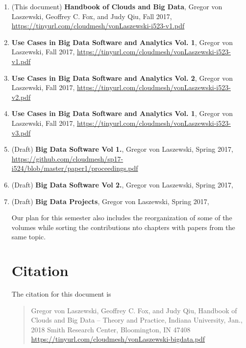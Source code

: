 \begin{enumerate}
\item (This document) {\bf Handbook of Clouds and Big Data}, Gregor von Laszewski,
  Geoffrey C. Fox, and Judy Qiu, Fall 2017,
  \url{https://tinyurl.com/cloudmesh/vonLaszewski-i523-v1.pdf}

\item {\bf Use Cases in Big Data Software and
  Analytics Vol. 1}, Gregor von Laszewski, Fall 2017,
  \url{https://tinyurl.com/cloudmesh/vonLaszewski-i523-v1.pdf}

\item {\bf Use Cases in Big Data Software and
  Analytics Vol. 2}, Gregor von Laszewski, Fall 2017, \url{https://tinyurl.com/cloudmesh/vonLaszewski-i523-v2.pdf}

\item  {\bf Use Cases in Big Data Software and
  Analytics Vol. 1}, Gregor von Laszewski, Fall 2017, \url{https://tinyurl.com/cloudmesh/vonLaszewski-i523-v3.pdf}

\item (Draft) {\bf Big Data Software Vol 1.}, Gregor von Laszewski, Spring 2017,
\url{https://github.com/cloudmesh/sp17-i524/blob/master/paper1/proceedings.pdf}

\item (Draft) {\bf Big Data Software Vol 2.}, Gregor von Laszewski, Spring 2017,

\item (Draft) {\bf Big Data Projects}, Gregor von Laszewski, Spring 2017,

Our plan for this semester also includes the reorganization of some of
the volumes while sorting the contributions nto chapters with papers
from the same topic.

\section{Citation}

The citation for this document is 

\begin{quote}
Gregor von Laszewski, Geoffrey C. Fox, and Judy Qiu, Handbook of
Clouds and Big Data -- Theory and Practice, Indiana University,
Jan., 2018
Smith Research Center, Bloomington, IN 47408
\url{https://tinyurl.com/cloudmesh/vonLaszewski-bigdata.pdf} 
\end{quote}


\end{enumerate}

